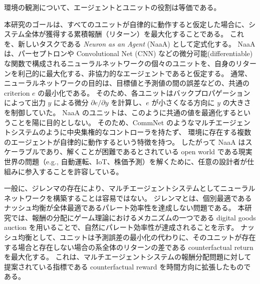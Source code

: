 \begin{center}
環境の観測について、エージェントとユニットの役割は等価である。
\end{center}



本研究のゴールは、すべてのユニットが自律的に動作すると仮定した場合に、システム全体が獲得する累積報酬（リターン）を最大化することである。
これを、新しいタスクである {\em Neuron as an Agent} (NaaA) として定式化する。
NaaA は、パーセプトロンや Convolutional Net (CNN) などの微分可能(differentiable)な関数で構成されるニューラルネットワークの個々のユニットを、自身のリターンを利己的に最大化する、非協力的なエージェントであると仮定する。
通常、ニューラルネットワークの目的は、目標値と予測値の間の誤差などの、共通の criterion $e$ の最小化である。
そのため、各ユニットはバックプロパゲーションによって出力 $y$ による微分 $\partial e / \partial y$ を計算し、$e$ が小さくなる方向に $y$ の大きさを制御していた。
NaaA のユニットは、このように共通の値を最適化するということを陽に目的としない。
そのため、CommNet \citep{sukhbaatar2016learning} のようなマルチエージェントシステムのように中央集権的なコントローラを持たず、
環境に存在する複数のエージェントが自律的に動作するという特徴を持つ。
したがって NaaA はスケーラブルであり、解くことが困難であるとされている open world である現実世界の問題（e.g., 自動運転、IoT、株価予測）を解くために、任意の設計者が仕組みに参入することを許容している。

一般に、ジレンマの存在により、マルチエージェントシステムとしてニューラルネットワークを構築することは容易ではない。
ジレンマとは、個別最適であるナッシュ均衡が全体最適であるパレート効率性を達成しない問題である。
本研究では、報酬の分配にゲーム理論におけるメカニズムの一つである digital goods auction \citep{guruswami2005profit} を用いることで、自然にパレート効率性が達成されることを示す。
ナッシュ均衡として、ユニットは予測誤差の最小化の代わりに、そのユニットが存在する場合と存在しない場合の系全体のリターンの差である counterfactual return を最大化する。
これは、マルチエージェントシステムの報酬分配問題に対して提案されている指標である counterfactual reward \citep{agogino2006quicr} を時間方向に拡張したものである。

